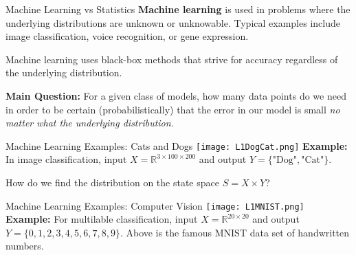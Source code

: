 \documentclass[10pt, handout]{beamer}
\begin{document}
\begin{frame}[fragile]{Machine Learning vs Statistics}
\textbf{Machine learning} is used in problems where the underlying distributions are unknown or unknowable. Typical examples include image classification, voice recognition, or gene expression. 

\begin{center}
\end{center}
Machine learning uses black-box methods that strive for accuracy regardless of the underlying distribution. 
\pause

\textbf{Main Question:} For a given class of models, how many data points do we need in order to be certain (probabilistically) that the error in our model is small \textit{no matter what the underlying distribution}.
\end{frame}






\begin{frame}[fragile]{Machine Learning Examples: Cats and Dogs}
\texttt{[image: L1DogCat.png]}
\textbf{Example:} 
In image classification, input $X = \mathbb{R}^{3\times 100\times 200}$ and output $Y = \{\text{"Dog"},\text{"Cat"}\}$. \pause 

How do we find the distribution on the state space $S = X\times Y$?
\end{frame}




\begin{frame}[fragile]{Machine Learning Examples: Computer Vision}
\texttt{[image: L1MNIST.png]}
\textbf{Example:} 
For multilable classification, input $X = \mathbb{R}^{20\times 20}$ and output $Y = \{0,1,2,3,4,5,6,7,8,9\}$. Above is the famous MNIST data set of handwritten numbers. 
\end{frame}
\end{document}
